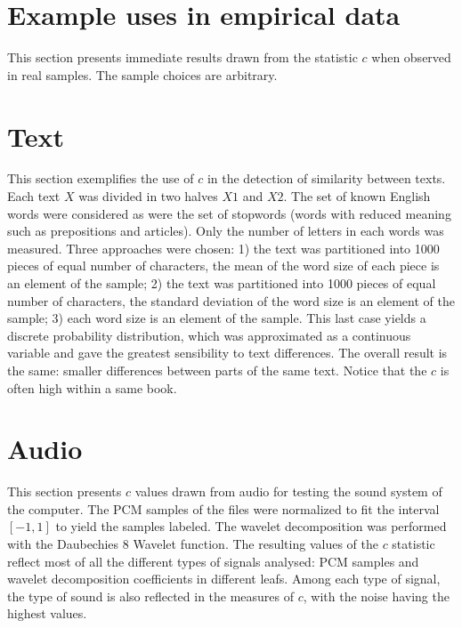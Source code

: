 \documentclass[%
	aip,
	jmp,%
	amsmath,amssymb,
	reprint,%
]{revtex4-1}
\begin{document}

\FloatBarrier
\section{Example uses in empirical data}\label{sec:empirical}

This section presents immediate results
drawn from the statistic $c$ when observed
in real samples.
The sample choices are arbitrary.

\section{Text}
This section exemplifies the use of $c$
in the detection of similarity between texts.
Each text $X$ was divided in two halves $X1$ and $X2$.
The set of known English words were considered as were 
the set of stopwords (words with reduced meaning such
as prepositions and articles).
Only the number of letters in each words was measured.
Three approaches were chosen: 1) the text was partitioned into 1000 pieces of equal number of characters, the mean of the word size of each piece is an element of the sample; 2) the text was partitioned into 1000 pieces of equal number of characters, the standard deviation of the word size is an element of the sample; 3) each word size is an element of the sample.
This last case yields a discrete probability distribution, which was approximated as a continuous variable and gave the greatest sensibility to text differences.
The overall result is the same: smaller differences between parts
of the same text.
Notice that the $c$ is often high within a same book.









\FloatBarrier
\section{Audio}
This section presents $c$ values
drawn from audio for testing the sound system of the computer.
The PCM samples of the files were normalized to fit the interval
$[-1,1]$ to yield the samples labeled. The wavelet decomposition was performed with the Daubechies 8 Wavelet function.
The resulting values of the $c$ statistic reflect most of all the
different types of signals analysed:
PCM samples and wavelet decomposition coefficients in different leafs.
Among each type of signal, the type of sound is also reflected in the measures of $c$, with the noise having the highest values.
\end{document}
